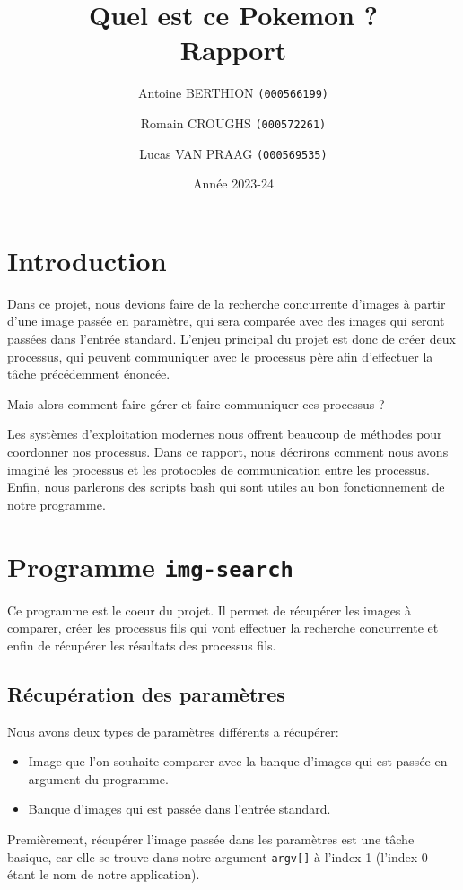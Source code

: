 \documentclass[french]{article}
\title{Quel est ce Pokemon ? \\ Rapport}
\date{Année 2023-24}
\author{Antoine BERTHION \texttt{(000566199)} \and Romain CROUGHS \texttt{(000572261)} \and Lucas VAN PRAAG \texttt{(000569535)}}
\begin{document}
\maketitle

\section{Introduction}
Dans ce projet, nous devions faire de la recherche concurrente d'images à partir d'une image passée en paramètre, qui sera comparée avec
des images qui seront passées dans l'entrée standard. L'enjeu principal du projet est donc de créer deux processus, qui peuvent communiquer
avec le processus père afin d'effectuer la tâche précédemment énoncée.

Mais alors comment faire gérer et faire communiquer ces processus ?

Les systèmes d'exploitation modernes nous offrent beaucoup de méthodes pour coordonner nos processus. Dans ce rapport, nous décrirons comment
nous avons imaginé les processus et les protocoles de communication entre les processus. Enfin, nous parlerons des scripts bash qui sont utiles
au bon fonctionnement de notre programme.

\section{Programme \texttt{img-search}}
Ce programme est le coeur du projet. Il permet de récupérer les images à comparer, créer les processus fils qui vont effectuer la recherche concurrente
et enfin de récupérer les résultats des processus fils. 

\subsection{Récupération des paramètres}
\noindent Nous avons deux types de paramètres différents a récupérer:

\begin{itemize}
  \item Image que l'on souhaite comparer avec la banque d'images qui est passée en argument du programme. 
  \item Banque d'images qui est passée dans l'entrée standard.
\end{itemize}

Premièrement, récupérer l'image passée dans les paramètres est une tâche basique, car elle se trouve dans notre argument \texttt{argv[]} 
à l'index 1 (l'index 0 étant le nom de notre application).
\end{document}
